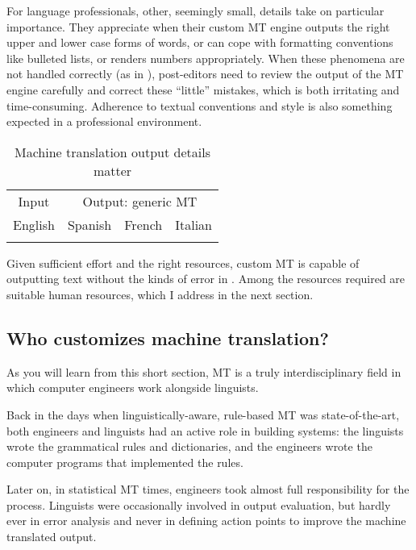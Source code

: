 \documentclass[output=paper]{langscibook}
\begin{document}
For language professionals, other, seemingly small, details take on particular importance. They appreciate when their custom MT engine outputs the right upper and lower case forms of words, or can cope with formatting conventions like bulleted lists, or renders numbers appropriately. When these phenomena are not handled correctly (as in ), post-editors  need to review the output of the MT engine carefully and correct these “little” mistakes, which is both irritating and time-consuming. Adherence to textual conventions and style is also something expected in a professional environment. 

\begin{table}
\caption{Machine translation output details matter\label{tab:1:details}}
\begin{tabular}{*4{c}}
\lsptoprule
{Input} & \multicolumn{3}{c}{Output: generic MT} \\\cmidrule(r){1-1}\cmidrule(l){2-4}
{English} & {Spanish} & {French} & {Italian} \\\lsptoprule
\end{tabular}
\end{table}


Given sufficient effort and the right resources, custom MT is capable of outputting text without the kinds of error in . Among the resources required are suitable human resources, which I address in the next section.

\subsection{Who customizes machine translation?}

As you will learn from this short section, MT is a truly interdisciplinary field in which  computer engineers work alongside linguists. 

Back in the days when linguistically-aware, rule-based MT was state-of-the-art, both engineers and linguists had an active role in building systems: the linguists wrote the grammatical rules and dictionaries, and the engineers wrote the computer programs that implemented the rules. 

\begin{sloppypar}
Later on, in statistical MT times, engineers took almost full responsibility for the process. Linguists were occasionally involved in output evaluation, but hardly ever in error analysis and never in defining action points to improve the machine translated output. 
\end{sloppypar}
\end{document}
